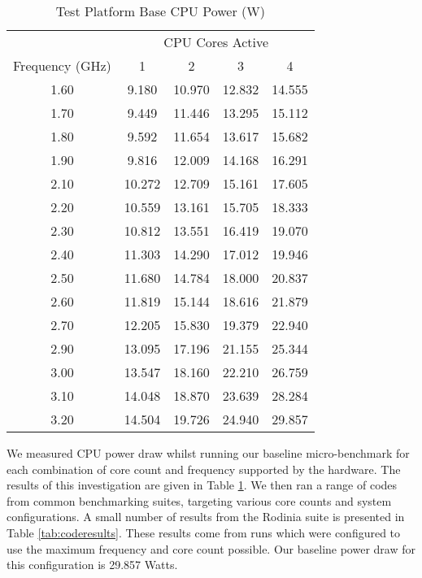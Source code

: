 \begin{table}
\centering
\small
\begin{tabular}{@{}ccccc@{}} \toprule
&\multicolumn{4}{c}{CPU Cores Active} \\ \cmidrule(r){2-5}
Frequency (GHz) & 1 & 2 & 3 & 4 \\ \midrule 
1.60 & 9.180 & 10.970 & 12.832 & 14.555 \\ 
1.70 & 9.449 & 11.446 & 13.295 & 15.112 \\ 
1.80 & 9.592 & 11.654 & 13.617 & 15.682 \\ 
1.90 & 9.816 & 12.009 & 14.168 & 16.291 \\ 
2.10 & 10.272 & 12.709 & 15.161 & 17.605 \\ 
2.20 & 10.559 & 13.161 & 15.705 & 18.333 \\ 
2.30 & 10.812 & 13.551 & 16.419 & 19.070 \\ 
2.40 & 11.303 & 14.290 & 17.012 & 19.946 \\ 
2.50 & 11.680 & 14.784 & 18.000 & 20.837 \\ 
2.60 & 11.819 & 15.144 & 18.616 & 21.879 \\ 
2.70 & 12.205 & 15.830 & 19.379 & 22.940 \\ 
2.90 & 13.095 & 17.196 & 21.155 & 25.344 \\ 
3.00 & 13.547 & 18.160 & 22.210 & 26.759 \\ 
3.10 & 14.048 & 18.870 & 23.639 & 28.284 \\ 
3.20 & 14.504 & 19.726 & 24.940 & 29.857 \\ 
\bottomrule
\end{tabular}
   \vspace{0.5\baselineskip}
\caption{Test Platform Base CPU Power (W)}
\label{tab:baseline}
\end{table} 

We measured CPU power draw whilst running our baseline micro-benchmark for each combination of core count and frequency supported by the hardware. The results of this investigation are given in Table \ref{tab:baseline}. We then ran a range of codes from common benchmarking suites, targeting various core counts and system configurations. A small number of results from the Rodinia suite is presented in Table \ref{tab:coderesults}. These results come from runs which were configured to use the maximum frequency and core count possible. Our baseline power draw for this configuration is 29.857 Watts.


